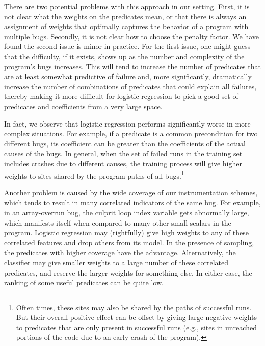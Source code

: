 There are two potential problems with
this approach in our setting.  First, it is not clear what the weights
on the predicates mean, or that there is always an assignment of
weights that optimally captures the behavior of a program with
multiple bugs.  Secondly, it is not clear how to choose the penalty
factor.  We have found the second issue is minor in practice.  For the
first issue, one might guess that the difficulty, if it exists, shows
up as the number and complexity of the program's bugs
increases.  This will tend to increase the number of predicates that
are at least somewhat predictive of failure and, more significantly,
dramatically increase the number of combinations of predicates that could
explain all failures, thereby making it more difficult for logistic
regression to pick a good set of predicates and coefficients from a very large
space.  

In fact, we observe that logistic regression performs significantly worse
in more complex situations. For example, if a predicate is a
common precondition for two different bugs, its coefficient
can be greater than the coefficients of the actual causes of the bugs.
In general, when the set of failed runs in
the training set includes crashes due to different causes, the
training process will give higher weights to sites shared by the
program paths of all bugs.\footnote{Often times, these sites may also be
shared by the paths of successful runs.  But their overall positive
effect can be offset by giving large negative weights to predicates
that are only present in successful runs (e.g., sites in unreached
portions of the code due to an early crash of the program).}

Another problem is caused by the wide coverage of our instrumentation
schemes, which tends to result in many correlated indicators of the
same bug.  For example, in an array-overrun bug, the culprit loop
index variable gets abnormally large, which manifests itself when
compared to many other small scalars in the program.  Logistic
regression may (rightfully) give high weights to any of these
correlated features and drop others from its model.  In the presence
of sampling, the predicates with higher coverage have the advantage.
Alternatively, the classifier may give smaller weights to a large
number of these correlated predicates, and reserve the larger weights
for something else. 
In either case, the ranking of some useful predicates can be quite low.

